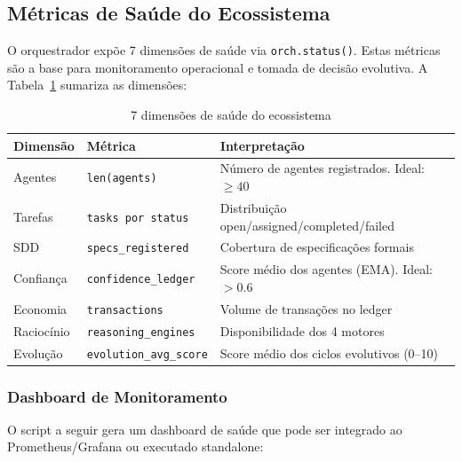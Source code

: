 \subsection{Métricas de Saúde do Ecossistema}
\label{sec:metricas-saude}

O orquestrador expõe 7 dimensões de saúde via \texttt{orch.status()}. Estas métricas são a base para monitoramento operacional e tomada de decisão evolutiva. A Tabela~\ref{tab:health-metrics} sumariza as dimensões:

\begin{table}[H]
\centering
\caption{7 dimensões de saúde do ecossistema}
\label{tab:health-metrics}
\begin{tabular}{@{}llp{7cm}@{}}
\toprule
\textbf{Dimensão} & \textbf{Métrica} & \textbf{Interpretação} \\
\midrule
Agentes & \texttt{len(agents)} & Número de agentes registrados. Ideal: $\ge 40$ \\
Tarefas & \texttt{tasks por status} & Distribuição open/assigned/completed/failed \\
SDD & \texttt{specs\_registered} & Cobertura de especificações formais \\
Confiança & \texttt{confidence\_ledger} & Score médio dos agentes (EMA). Ideal: $> 0.6$ \\
Economia & \texttt{transactions} & Volume de transações no ledger \\
Raciocínio & \texttt{reasoning\_engines} & Disponibilidade dos 4 motores \\
Evolução & \texttt{evolution\_avg\_score} & Score médio dos ciclos evolutivos (0--10) \\
\bottomrule
\end{tabular}
\end{table}

\subsubsection{Dashboard de Monitoramento}

O script a seguir gera um dashboard de saúde que pode ser integrado ao Prometheus/Grafana ou executado standalone:

